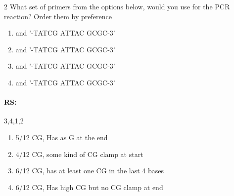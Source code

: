\documentclass[\mainfilename]{subfiles}
\begin{document}
\begin{questionBox}2{ %
    What set of primers from the options below, would you use for the PCR reaction? Order them by preference
} %
    \begin{enumerate}[
        label={Set \arabic{enumi}:},
        left={0em}
    ]
        \item {} and {'-TATCG ATTAC GCGC-3'}
        \item {} and {'-TATCG ATTAC GCGC-3'}
        \item {} and {'-TATCG ATTAC GCGC-3'}
        \item {} and {'-TATCG ATTAC GCGC-3'}
    \end{enumerate}

    \paragraph{RS:} 3,4,1,2\\
    \begin{enumerate}[label=\arabic{enumi}.]
        \item 5/12 CG, Has as G at the end
        \item 4/12 CG, some kind of CG clamp at start
        \item 6/12 CG, has at least one CG in the last 4 bases
        \item 6/12 CG, Has high CG but no CG clamp at end
    \end{enumerate}
\end{questionBox}
\end{document}
